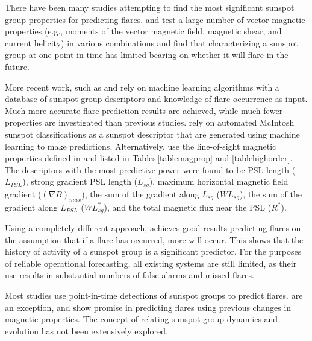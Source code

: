 There have been many studies attempting to find the most significant sunspot group properties for predicting flares. \cite{Leka:2003a,Leka:2003b,Leka:2007} and \cite{Barnes:2006} test a large number of vector magnetic properties (e.g., moments of the vector magnetic field, magnetic shear, and current helicity) in various combinations and find that characterizing a sunspot group at one point in time has limited bearing on whether it will flare in the future. 

More recent work, such as \cite{Colak:2009} and \cite{Ahmed:2011} rely on machine learning algorithms with a database of sunspot group descriptors and knowledge of flare occurrence as input. Much more accurate flare prediction results are achieved, while much fewer properties are investigated than previous studies.  \cite{Colak:2009} rely on automated McIntosh sunspot classifications as a sunspot descriptor that are generated using machine learning to make predictions. Alternatively, \cite{Ahmed:2011} use the line-of-sight magnetic properties defined in \cite{higgins:2011} and listed in Tables\,\ref{tablemagprop} and \ref{tablehighorder}. The descriptors with the most predictive power were found to be \gls{PSL} length ($L_{PSL}$), strong gradient \gls{PSL} length ($L_{sg}$), maximum horizontal magnetic field gradient ($(\nabla B)_{max}$), the sum of the gradient along $L_{sg}$ ($WL_{sg}$), the sum of the gradient along $L_{PSL}$ ($WL^*_{sg}$), and the total magnetic flux near the \gls{PSL} ($R^*$).

Using a completely different approach, \cite{Wheatland:2005} achieves good results predicting flares on the assumption that if a flare has occurred, more will occur. This shows that the history of activity of a sunspot group is a significant predictor. For the purposes of reliable operational forecasting, all existing systems are still limited, as their use results in substantial numbers of false alarms and missed flares. 

Most studies use point-in-time detections of sunspot groups to predict flares. \cite{Mason:2010} are an exception, and show promise in predicting flares using previous changes in magnetic properties. %
The concept of relating sunspot group dynamics and evolution has not been extensively explored.


